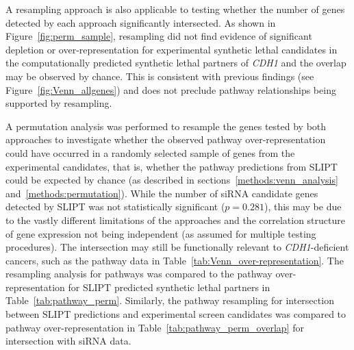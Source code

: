 A resampling approach is also applicable to testing whether the number of genes detected by each approach significantly intersected. As shown in Figure~\ref{fig:perm_sample}, resampling did not find evidence of significant depletion or over-represent\-ation for experimental synthetic lethal candidates in the computationally predicted synthetic lethal partners of \textit{CDH1} and the overlap may be observed by chance. This is consistent with previous findings (see Figure~\ref{fig:Venn_allgenes}) and does not preclude pathway relationships being supported by resampling.

A permutation analysis was performed to resample the genes tested by both approaches to investigate whether the observed pathway over-represent\-ation could have occurred in a randomly selected sample of genes from the experimental candidates, that is, whether the pathway predictions from \gls{SLIPT} could be expected by chance (as described in sections~\ref{methods:venn_analysis} and~\ref{methods:permutation}).
While the number of siRNA candidate genes detected by \gls{SLIPT} was not statistically significant ($p=0.281$), this may be due to the vastly different limitations of the approaches and the correlation structure of gene expression not being independent (as assumed for multiple testing procedures). The  intersection may still be functionally relevant to \textit{CDH1}-deficient cancers, such as the pathway data in Table~\ref{tab:Venn_over-representation}. The resampling analysis for pathways was compared to the pathway over-represent\-ation for \gls{SLIPT} predicted synthetic lethal partners in Table~\ref{tab:pathway_perm}. Similarly, the pathway resampling for intersection between \gls{SLIPT} predictions and experimental screen candidates was compared to pathway over-represent\-ation in Table~\ref{tab:pathway_perm_overlap} for intersection with siRNA data.


